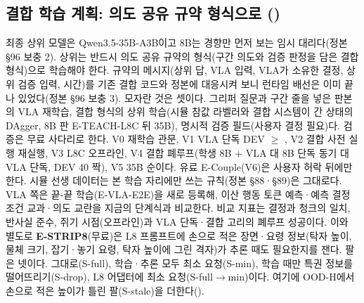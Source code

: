 \subsection{결합 학습 계획: 의도 공유 규약 형식으로 ()}
\label{sec:plan_coupled}
최종 상위 모델은 Qwen3.5-35B-A3B이고 8B는 경향만 먼저 보는 임시 대리다(정본 §96 보충 2). 상위는 반드시 의도 공유 규약의 형식(구간 의도와 검증 판정을 담은 결합 형식)으로 학습해야 한다. 규약의 메시지(상위 답, VLA 입력, VLA가 소유한 결정, 상위 검증 입력, 시간)를 기존 결합 코드와 정본에 대응시켜 보니 런타임 배선은 이미 끝나 있었다(정본 §96 보충 3). 모자란 것은 셋이다. 그리퍼 질문과 구간 줄을 넣은 판본의 VLA 재학습, 결합 형식의 상위 학습(시뮬 참값 라벨러와 결합 시스템이 간 상태의 DAgger, 8B 판 E-TEACH-L8C 뒤 35B), 명시적 검증 필드(사용자 결정 필요)다. 검증은 무료 사다리로 한다. V0 재학습 관문, V1 VLA 단독 DEV $\ge$ , V2 결합 사전 실행 재실행, V3 L8C 오프라인, V4 결합 폐루프(학생 8B + VLA 대 8B 단독 동기 대 VLA 단독, DEV 40 짝), V5 35B 순이다. 유료 E-Couple(V6)은 사용자 허락 뒤에만 한다. 시뮬 선생 데이터는 본 학습 자리에만 쓰는 규칙(정본 §88·§89)은 그대로다. VLA 쪽은 끝-끝 학습(E-VLA-E2E)을 새로 등록해, 이산 행동 토큰 예측·예측 결정 조건 교과·의도 교란을 지금의 단계식과 비교한다. 비교 지표는 결정과 청크의 일치, 반사실 준수, 쥐기 시점(오프라인)과 VLA 단독·결합 고리의 폐루프 성공이다. 이와 별도로 \textbf{E-STRIP8}(무료)은 L8 프롬프트에 손으로 적은 장면·요령 정보(탁자 높이, 물체 크기, 잡기·놓기 요령, 탁자 높이에 그린 격자)가 추론 때도 필요한지를 잰다. 팔은 넷이다. 그대로(S-full), 학습·추론 모두 최소 요청(S-min), 학습 때만 특권 정보를 떨어뜨리기(S-drop), L8 어댑터에 최소 요청(S-full$\rightarrow$min)이다. 여기에 OOD-H에서 손으로 적은 높이가 틀린 팔(S-stale)을 더한다().

